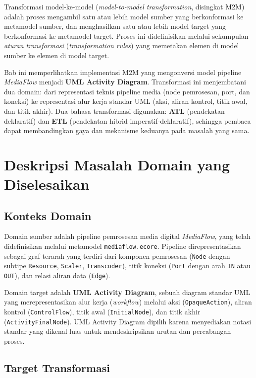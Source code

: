 Transformasi model-ke-model (\textit{model-to-model transformation}, disingkat M2M) adalah proses mengambil satu atau lebih model sumber yang berkonformasi ke metamodel sumber, dan menghasilkan satu atau lebih model target yang berkonformasi ke metamodel target. Proses ini didefinisikan melalui sekumpulan \textit{aturan transformasi} (\textit{transformation rules}) yang memetakan elemen di model sumber ke elemen di model target.

Bab ini memperlihatkan implementasi M2M yang mengonversi model pipeline \textit{MediaFlow} menjadi \textbf{UML Activity Diagram}. Transformasi ini menjembatani dua domain: dari representasi teknis pipeline media (node pemrosesan, port, dan koneksi) ke representasi alur kerja standar UML (aksi, aliran kontrol, titik awal, dan titik akhir). Dua bahasa transformasi digunakan: \textbf{ATL} (pendekatan deklaratif) dan \textbf{ETL} (pendekatan hibrid imperatif-deklaratif), sehingga pembaca dapat membandingkan gaya dan mekanisme keduanya pada masalah yang sama.

\section{Deskripsi Masalah Domain yang Diselesaikan}

\subsection{Konteks Domain}

Domain sumber adalah pipeline pemrosesan media digital \textit{MediaFlow}, yang telah didefinisikan melalui metamodel \texttt{mediaflow.ecore}. Pipeline direpresentasikan sebagai graf terarah yang terdiri dari komponen pemrosesan (\texttt{Node} dengan subtipe \texttt{Resource}, \texttt{Scaler}, \texttt{Transcoder}), titik koneksi (\texttt{Port} dengan arah \texttt{IN} atau \texttt{OUT}), dan relasi aliran data (\texttt{Edge}).

Domain target adalah \textbf{UML Activity Diagram}, sebuah diagram standar UML yang merepresentasikan alur kerja (\textit{workflow}) melalui aksi (\texttt{OpaqueAction}), aliran kontrol (\texttt{ControlFlow}), titik awal (\texttt{InitialNode}), dan titik akhir (\texttt{ActivityFinalNode}). UML Activity Diagram dipilih karena menyediakan notasi standar yang dikenal luas untuk mendeskripsikan urutan dan percabangan proses.

\subsection{Target Transformasi}

